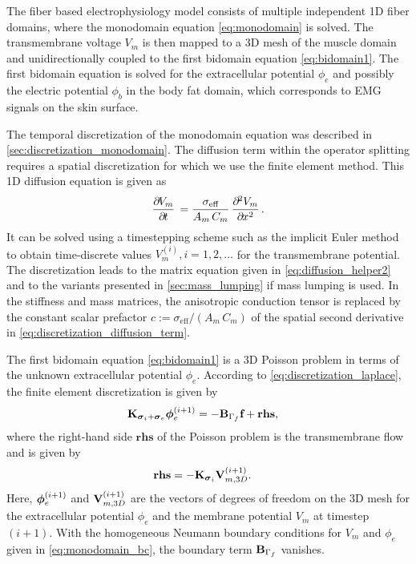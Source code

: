The fiber based electrophysiology model consists of multiple independent 1D fiber domains, where the monodomain equation \cref{eq:monodomain} is solved. The transmembrane voltage $V_m$ is then mapped to a 3D mesh of the muscle domain and unidirectionally coupled to the first bidomain equation \cref{eq:bidomain1}. The first bidomain equation is solved for the extracellular potential $\phi_e$ and possibly the electric potential $\phi_b$ in the body fat domain, which corresponds to EMG signals on the skin surface.

The temporal discretization of the monodomain equation was described in \cref{sec:discretization_monodomain}. The diffusion term within the operator splitting requires a spatial discretization for which we use the finite element method. This 1D diffusion equation is given as
\begin{align}\label{eq:discretization_diffusion_term}
  \p{V_m}{t} = \dfrac{\sigma_\text{eff}}{A_m\,C_m} \p{V_m}{x}{2}.
\end{align}
It can be solved using a timestepping scheme such as the implicit Euler method to obtain time-discrete values $V_m^{(i)}, i=1,2,\dots$ for the transmembrane potential. The discretization leads to the matrix equation given in \cref{eq:diffusion_helper2} and to the variants presented in \cref{sec:mass_lumping} if mass lumping is used. In the stiffness and mass matrices, the anisotropic conduction tensor is replaced by the constant scalar prefactor $c := \sigma_\text{eff}/(A_m\,C_m)$ of the spatial second derivative in \cref{eq:discretization_diffusion_term}.

The first bidomain equation \cref{eq:bidomain1} is a 3D Poisson problem in terms of the unknown extracellular potential $\phi_e$. According to \cref{eq:discretization_laplace}, the finite element discretization is given by%
\begin{align*}
  \textbf{K}_{\boldsymbol{\sigma}_i + \boldsymbol{\sigma}_e} \boldsymbol{\phi}_e^{(i+1)} &= - \textbf{B}_{\Gamma_f}\textbf{f} + \textbf{rhs},
\end{align*}
where the right-hand side $\textbf{rhs}$ of the Poisson problem is the transmembrane flow and is given by
\begin{align}\label{eq:static_bidomain_rhs}
  \textbf{rhs} &= -\textbf{K}_{\boldsymbol{\sigma}_i} \textbf{V}_{m,3D}^{(i+1)}.
\end{align}
Here, $\boldsymbol{\phi}_e^{(i+1)}$ and $\textbf{V}_{m,3D}^{(i+1)}$ are the vectors of degrees of freedom on the 3D mesh for the extracellular potential $\phi_e$ and the membrane potential $V_m$ at timestep $(i+1)$. With the homogeneous Neumann boundary conditions for $V_m$ and $\phi_e$ given in \cref{eq:monodomain_bc}, the boundary term $\textbf{B}_{\Gamma_f}$ vanishes.

